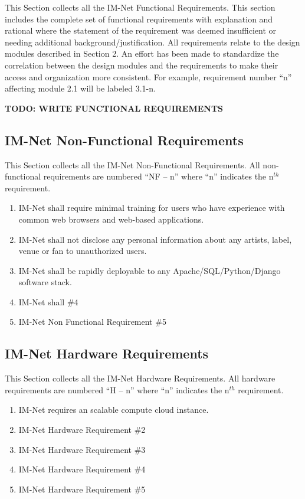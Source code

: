 \documentclass[letterpaper]{article}
\begin{document}
This Section collects all the IM-Net Functional Requirements. This section includes the complete set of functional requirements with explanation and rational where the statement of the requirement was deemed insufficient or needing additional background/justification. All requirements relate to the design modules described in Section 2. An effort has been made to standardize the correlation between the design modules and the requirements to make their access and organization more consistent. For example, requirement number ``n'' affecting module 2.1 will be labeled 3.1-n.

\textbf{TODO: WRITE FUNCTIONAL REQUIREMENTS}\\

\subsection{IM-Net Non-Functional Requirements}

This Section collects all the IM-Net Non-Functional Requirements. All non-functional requirements are numbered ``NF -- n'' where ``n'' indicates the n${}^{th}$ requirement.

\begin{enumerate}
\item  IM-Net shall require minimal training for users who have experience with common web browsers and web-based applications.

\item  IM-Net shall not disclose any personal information about any artists, label, venue or fan to unauthorized users.

\item  IM-Net shall be rapidly deployable to any Apache/SQL/Python/Django software stack.

\item  IM-Net shall  \#4

\item  IM-Net Non Functional Requirement \#5
\end{enumerate}

\subsection{IM-Net Hardware Requirements}

This Section collects all the IM-Net Hardware Requirements. All hardware requirements are numbered ``H -- n'' where ``n'' indicates the n${}^{th}$ requirement.

\begin{enumerate}
\item  IM-Net requires an scalable compute cloud instance.

\item  IM-Net Hardware Requirement \#2

\item  IM-Net Hardware Requirement \#3

\item  IM-Net Hardware Requirement \#4

\item  IM-Net Hardware Requirement \#5
\end{enumerate}
\end{document}
